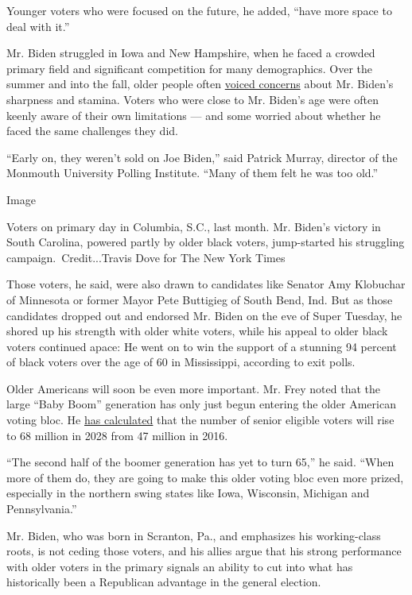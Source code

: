 Younger voters who were focused on the future, he added, ``have more
space to deal with it.''

Mr. Biden struggled in Iowa and New Hampshire, when he faced a crowded
primary field and significant competition for many demographics. Over
the summer and into the fall, older people often
\href{https://www.nytimes3xbfgragh.onion/2019/07/29/us/politics/joe-biden-age.html}{voiced
concerns} about Mr. Biden's sharpness and stamina. Voters who were close
to Mr. Biden's age were often keenly aware of their own limitations ---
and some worried about whether he faced the same challenges they did.

``Early on, they weren't sold on Joe Biden,'' said Patrick Murray,
director of the Monmouth University Polling Institute. ``Many of them
felt he was too old.''

Image

Voters on primary day in Columbia, S.C., last month. Mr. Biden's victory
in South Carolina, powered partly by older black voters, jump-started
his struggling campaign.~Credit...Travis Dove for The New York Times

Those voters, he said, were also drawn to candidates like Senator Amy
Klobuchar of Minnesota or former Mayor Pete Buttigieg of South Bend,
Ind. But as those candidates dropped out and endorsed Mr. Biden on the
eve of Super Tuesday, he shored up his strength with older white voters,
while his appeal to older black voters continued apace: He went on to
win the support of a stunning 94 percent of black voters over the age of
60 in Mississippi, according to exit polls.

Older Americans will soon be even more important. Mr. Frey noted that
the large ``Baby Boom'' generation has only just begun entering the
older American voting bloc. He
\href{https://academic.oup.com/ppar/article/28/1/9/4958149}{has
calculated} that the number of senior eligible voters will rise to 68
million in 2028 from 47 million in 2016.

``The second half of the boomer generation has yet to turn 65,'' he
said. ``When more of them do, they are going to make this older voting
bloc even more prized, especially in the northern swing states like
Iowa, Wisconsin, Michigan and Pennsylvania.''

Mr. Biden, who was born in Scranton, Pa., and emphasizes his
working-class roots, is not ceding those voters, and his allies argue
that his strong performance with older voters in the primary signals an
ability to cut into what has historically been a Republican advantage in
the general election.

